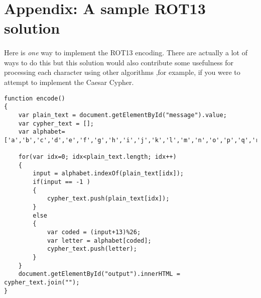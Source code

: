 \documentclass[10pt, a4paper, twosize]{article}
\begin{document}
\section{Appendix: A sample ROT13 solution}
\label{solution}
\paragraph{} Here is \emph{one} way to implement the ROT13 encoding. There are actually a lot of ways to do this but this solution would also contribute some usefulness for processing each character using other algorithms ,for example, if you were to attempt to implement the Caesar Cypher.

\begin{lstlisting}
function encode() 
{ 
    var plain_text = document.getElementById("message").value;
    var cypher_text = [];
    var alphabet=['a','b','c','d','e','f','g','h','i','j','k','l','m','n','o','p','q','r','s','t','u','v','w','x','y','z']

    for(var idx=0; idx<plain_text.length; idx++)
    {
        input = alphabet.indexOf(plain_text[idx]);
        if(input == -1 )
        {
            cypher_text.push(plain_text[idx]);
        }
        else
        {
            var coded = (input+13)%26;
            var letter = alphabet[coded];
            cypher_text.push(letter);
        }
    }
    document.getElementById("output").innerHTML = cypher_text.join("");
}
\end{lstlisting}
\end{document}
